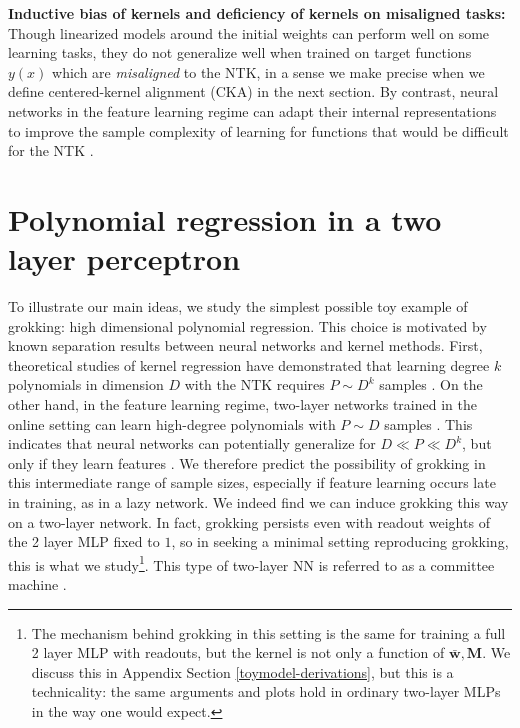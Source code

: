 \documentclass{article} %
\def\w{\bm w}
\def\M{\bm M}
\begin{document}
\noindent \textbf{Inductive bias of kernels and deficiency of kernels on misaligned tasks:}
Though linearized models around the initial weights can perform well on some learning tasks, they do not generalize well when trained on target functions $y(x)$ which are \textit{misaligned} to the NTK, in a sense we make precise when we define centered-kernel alignment (CKA) in the next section. By contrast, neural networks in the feature learning regime can adapt their internal representations to improve the sample complexity of learning for functions that would be difficult for the NTK \citep{ghorbani2019limitations, arnaboldi2023high, ba2022high, damian2023smoothing}. 





\section{Polynomial regression in a two layer perceptron}\label{polyreg}

To illustrate our main ideas, we study the simplest possible toy example of grokking: high dimensional polynomial regression. This choice is motivated by known separation results between neural networks and kernel methods. First, theoretical studies of kernel regression have demonstrated that learning degree $k$ polynomials in dimension $D$ with the NTK requires $P \sim D^{k}$ samples \citep{bordelon2020spectrum, canatar2021spectral, xiao2022precise}. On the other hand, in the feature learning regime, two-layer networks trained in the online setting can learn high-degree polynomials with $P \sim D$ samples \citep{saad1995line, engel2001statistical, goldt2019generalisation, arnaboldi2023high, berthier2023learning, sarao2020optimization}. This indicates that neural networks can potentially generalize for $D \ll P \ll D^k$, but only if they learn features \citep{atanasov2022onset}. We therefore predict the possibility of grokking in this intermediate range of sample sizes, especially if feature learning occurs late in training, as in a lazy network. We indeed find we can induce grokking this way on a two-layer network. In fact, grokking persists even with readout weights of the 2 layer MLP fixed to $1$, so in seeking a minimal setting reproducing grokking, this is what we study\footnote{The mechanism behind grokking in this setting is the same for training a full 2 layer MLP with readouts, but the kernel is not only a function of $\bar{\w}, \M$. We discuss this in Appendix Section \ref{toymodel-derivations}, but this is a technicality: the same arguments and plots hold in ordinary two-layer MLPs in the way one would expect.}. This type of two-layer NN is referred to as a committee machine \citep{saad1995line}.
\end{document}
